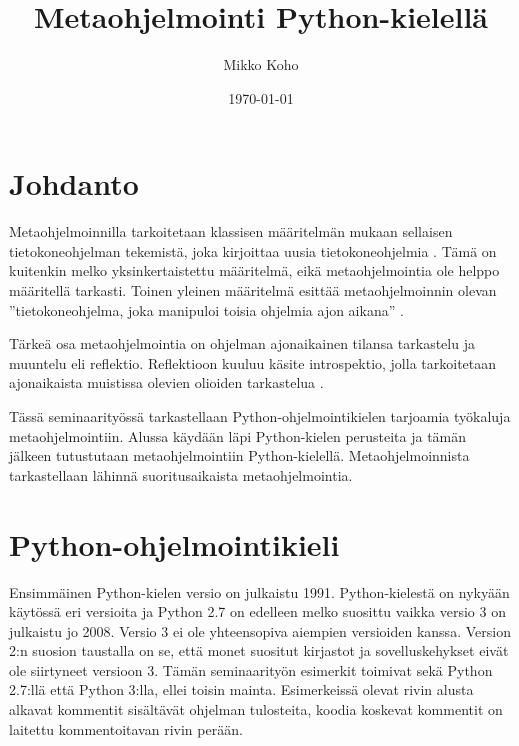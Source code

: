 \documentclass[finnish]{tktltiki2}
\title{Metaohjelmointi Python-kielellä}
\author{Mikko Koho}
\date{\today}
\theoremstyle{definition}
\theoremstyle{remark}
\begin{document}
    

\frontmatter      %

\maketitle        %

\makeabstract     %

\tableofcontents  %


\mainmatter       %


\section{Johdanto}

Metaohjelmoinnilla tarkoitetaan klassisen määritelmän mukaan sellaisen tietokoneohjelman tekemistä, joka kirjoittaa uusia tietokoneohjelmia \cite{hazzard2013}. Tämä on kuitenkin melko yksinkertaistettu määritelmä, eikä metaohjelmointia ole helppo määritellä tarkasti. Toinen yleinen määritelmä esittää metaohjelmoinnin olevan ''tietokoneohjelma, joka manipuloi toisia ohjelmia ajon aikana'' \cite{hazzard2013}. 

Tärkeä osa metaohjelmointia on ohjelman ajonaikainen tilansa tarkastelu ja muuntelu eli reflektio. Reflektioon kuuluu käsite introspektio, jolla tarkoitetaan ajonaikaista muistissa olevien olioiden tarkastelua \cite{dive-into-python}.

Tässä seminaarityössä tarkastellaan Python-ohjelmointikielen tarjoamia työkaluja metaohjelmointiin. Alussa käydään läpi Python-kielen perusteita ja tämän jälkeen tutustutaan metaohjelmointiin Python-kielellä. Metaohjelmoinnista tarkastellaan lähinnä suoritusaikaista metaohjelmointia. 



\section{Python-ohjelmointikieli}

Ensimmäinen Python-kielen versio on julkaistu 1991. Python-kielestä on nykyään käytössä eri versioita ja Python 2.7 on edelleen melko suosittu vaikka versio 3 on julkaistu jo 2008. Versio 3 ei ole yhteensopiva aiempien versioiden kanssa. Version 2:n suosion taustalla on se, että monet suositut kirjastot ja sovelluskehykset eivät ole siirtyneet versioon 3. Tämän seminaarityön esimerkit toimivat sekä Python 2.7:llä että Python 3:lla, ellei toisin mainta. Esimerkeissä olevat rivin alusta alkavat kommentit sisältävät ohjelman tulosteita, koodia koskevat kommentit on laitettu kommentoitavan rivin perään.
\end{document}
